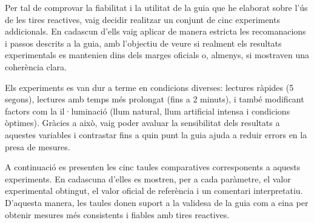 Per tal de comprovar la fiabilitat i la utilitat de la guia que he elaborat sobre l’ús de les tires reactives, vaig decidir realitzar un conjunt de cinc experiments addicionals. En cadascun d’ells vaig aplicar de manera estricta les recomanacions i passos descrits a la guia, amb l’objectiu de veure si realment els resultats experimentals es mantenien dins dels marges oficials o, almenys, si mostraven una coherència clara.

Els experiments es van dur a terme en condicions diverses: lectures ràpides (5 segons), lectures amb temps més prolongat (fins a 2 minuts), i també modificant factors com la il·luminació (llum natural, llum artificial intensa i condicions òptimes). Gràcies a això, vaig poder avaluar la sensibilitat dels resultats a aquestes variables i contrastar fins a quin punt la guia ajuda a reduir errors en la presa de mesures.

A continuació es presenten les cinc taules comparatives corresponents a aquests experiments. En cadascuna d’elles es mostren, per a cada paràmetre, el valor experimental obtingut, el valor oficial de referència i un comentari interpretatiu. D’aquesta manera, les taules donen suport a la validesa de la guia com a eina per obtenir mesures més consistents i fiables amb tires reactives.


